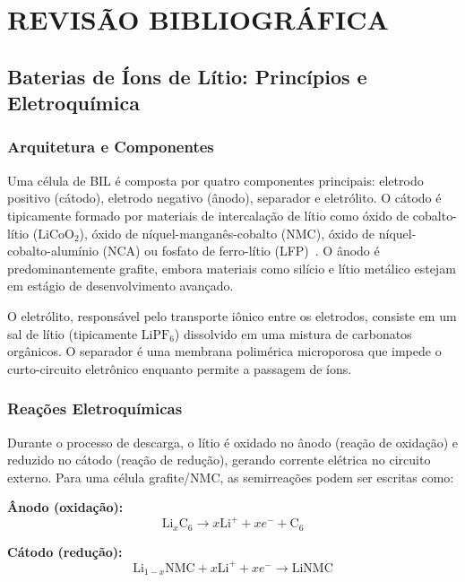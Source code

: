 \documentclass[
    12pt,
    openright,
    twoside,
    a4paper,
    brazil,
    english
]{abntex2}
\begin{document}
\chapter{REVISÃO BIBLIOGRÁFICA}
\label{cap:revisao}

\section{Baterias de Íons de Lítio: Princípios e Eletroquímica}

\subsection{Arquitetura e Componentes}

Uma célula de BIL é composta por quatro componentes principais: eletrodo
positivo (cátodo), eletrodo negativo (ânodo), separador e eletrólito. O cátodo é
tipicamente formado por materiais de intercalação de lítio como óxido de
cobalto-lítio ($\text{LiCoO}_2$), óxido de níquel-manganês-cobalto (NMC),
óxido de níquel-cobalto-alumínio (NCA) ou fosfato de ferro-lítio
(LFP)~\cite{goodenough2013li}. O ânodo é predominantemente grafite, embora
materiais como silício e lítio metálico estejam em estágio de desenvolvimento
avançado.

O eletrólito, responsável pelo transporte iônico entre os eletrodos, consiste em
um sal de lítio (tipicamente $\text{LiPF}_6$) dissolvido em uma mistura de
carbonatos orgânicos. O separador é uma membrana polimérica microporosa que
impede o curto-circuito eletrônico enquanto permite a passagem de íons.

\subsection{Reações Eletroquímicas}

Durante o processo de descarga, o lítio é oxidado no ânodo (reação de oxidação)
e reduzido no cátodo (reação de redução), gerando corrente elétrica no circuito
externo. Para uma célula grafite/NMC, as semirreações podem ser escritas como:

\textbf{Ânodo (oxidação):}
\begin{equation}
  \text{Li}_x\text{C}_6 \rightarrow x\text{Li}^+ + xe^- + \text{C}_6
\end{equation}

\textbf{Cátodo (redução):}
\begin{equation}
  \text{Li}_{1-x}\text{NMC} + x\text{Li}^+ + xe^- \rightarrow \text{Li}\text{NMC}
\end{equation}
\end{document}
